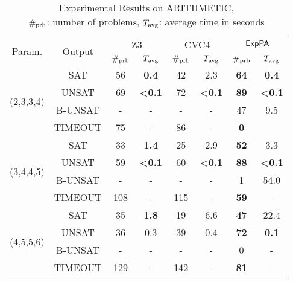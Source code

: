 \begin{table*}[ht]
        \caption{Experimental Results on ARITHMETIC, \\
    $\#_{\rm prb}$: number of problems, $T_{\rm avg}$: average time in seconds}
    \centering
    \renewcommand{\arraystretch}{1.2}
    \begin{tabular}{|c|c|c|c|c|c|c|c|}
    \hline
        \multirow{2}{*}{Param. }  & \multirow{2}{*}{Output} & \multicolumn{2}{c|}{Z3} & \multicolumn{2}{c|}{CVC4} & \multicolumn{2}{c|}{${\sf ExpPA}$} \\
        \cline{3-8}
        &  & $\#_{\rm prb}$ & $T_{\rm avg}$  & $\#_{\rm prb}$ & $T_{\rm avg}$  & $\#_{\rm prb}$ & $T_{\rm avg}$  \\ \hline
        \multirow{4}{*}{(2,3,3,4)} & SAT & 56 & {\bf 0.4} & 42 & 2.3 & {\bf 64} & {\bf 0.4} \\
        \cline{2-8}
         & UNSAT & 69 & {\bf \textless{}0.1} & 72 &  {\bf \textless{}0.1} & {\bf 89} & {\bf \textless{}0.1} \\
         \cline{2-8}
         & B-UNSAT & - & - & - & - & 47 & 9.5 \\
         \cline{2-8}
         & TIMEOUT & 75 & - & 86 & - & {\bf 0} & - \\ \hline
         \cline{1-8}
        \multirow{4}{*}{(3,4,4,5)} & SAT & 33 & {\bf 1.4} & 25 & 2.9 & {\bf 52} & 3.3 \\
        \cline{2-8}
         & UNSAT & 59 & {\bf \textless{}0.1} & 60 & {\bf \textless{}0.1} & {\bf 88} & {\bf \textless{}0.1} \\
         \cline{2-8}
         & B-UNSAT & -  & - &  - & -  & 1 & 54.0 \\
         \cline{2-8}
         & TIMEOUT & 108 & - & 115 & - & {\bf 59} & - \\ \hline
         \cline{1-8}
        \multirow{4}{*}{(4,5,5,6)} & SAT & 35 & {\bf 1.8} & 19 & 6.6 & {\bf 47} & 22.4 \\
        \cline{2-8}
         & UNSAT & 36 & 0.3 & 39 & 0.4 & {\bf 72} & {\bf 0.1} \\
         \cline{2-8}
         & B-UNSAT & -  & -  & - & - & 0 & - \\
         \cline{2-8}
         & TIMEOUT & 129 & - & 142 & - & {\bf 81} & -\\
         \hline
        \end{tabular}
            \label{table:arithmetic}
\end{table*}


